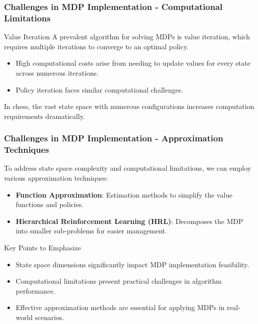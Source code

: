 \documentclass{beamer}
\begin{document}
\begin{frame}[fragile]
    \frametitle{Challenges in MDP Implementation - Computational Limitations}
    \begin{block}{Value Iteration}
        A prevalent algorithm for solving MDPs is value iteration, which requires multiple iterations to converge to an optimal policy.
    \end{block}
    
    \begin{itemize}
        \item High computational costs arise from needing to update values for every state across numerous iterations.
        \item Policy iteration faces similar computational challenges.
    \end{itemize}
    
    \begin{example}
        In chess, the vast state space with numerous configurations increases computation requirements dramatically.
    \end{example}
\end{frame}

\begin{frame}[fragile]
    \frametitle{Challenges in MDP Implementation - Approximation Techniques}
    To address state space complexity and computational limitations, we can employ various approximation techniques:
    \begin{itemize}
        \item \textbf{Function Approximation}: Estimation methods to simplify the value functions and policies.
        \item \textbf{Hierarchical Reinforcement Learning (HRL)}: Decomposes the MDP into smaller sub-problems for easier management.
    \end{itemize}
    
    \begin{block}{Key Points to Emphasize}
        \begin{itemize}
            \item State space dimensions significantly impact MDP implementation feasibility.
            \item Computational limitations present practical challenges in algorithm performance.
            \item Effective approximation methods are essential for applying MDPs in real-world scenarios.
        \end{itemize}
    \end{block}
\end{frame}
\end{document}
